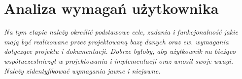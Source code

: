 \section{Analiza wymagań użytkownika}

\textit{Na tym etapie należy określić podstawowe
cele, zadania i funkcjonalność jakie mają być realizowane przez projektowaną bazę danych
oraz ew. wymagania dotyczące projektu i dokumentacji. Dobrze byłoby, aby użytkownik
na bieżąco współuczestniczył w projektowaniu i implementacji oraz wnosił swoje uwagi.
Należy zidentyfikować wymagania jawne i niejawne.} \\

